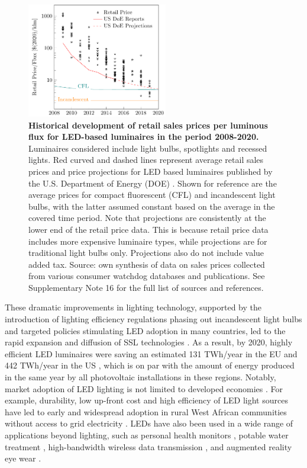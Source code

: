 \documentclass[parskip=full]{article}
\begin{document}
\begin{figure}[h!]
\centering
  \includegraphics[height=5cm]{figures/cost_lamp_small.pdf}
  \caption{\textbf{Historical development of retail sales prices per luminous flux for LED-based luminaires in the period 2008-2020.} Luminaires considered include light bulbs, spotlights and recessed lights. Red curved and dashed lines represent average retail sales prices and price projections for LED based luminaires published by the U.S. Department of Energy (DOE) \cite{national2013assessment}. Shown for reference are the average prices for compact fluorescent (CFL) and incandescent light bulbs, with the latter assumed constant based on the average in the covered time period. Note that projections are consistently at the lower end of the retail price data. This is because retail price data includes more expensive luminaire types, while projections are for traditional light bulbs only. Projections also do not include value added tax. Source: own synthesis of data on sales prices collected from various consumer watchdog databases and publications. See Supplementary Note 16 for the full list of sources and references.}
  \label{fgr:cost_lamp_small}
\end{figure}

These dramatic improvements in lighting technology, supported by the introduction of lighting efficiency regulations phasing out incandescent light bulbs and targeted policies stimulating LED adoption in many countries, led to the rapid expansion and diffusion of SSL technologies \cite{weinold2020long, stegmaier2021incandescent, Mills2014}. As a result, by 2020, highly efficient LED luminaires were saving an estimated 131 TWh/year in the EU \cite{eu2019impactass} and 442 TWh/year in the US \cite{guidehouse2020adoption}, which is on par with the amount of energy produced in the same year by all photovoltaic installations in these regions. Notably, market adoption of LED lighting is not limited to developed economies \cite{Kamat2020}. For example, durability, low up-front cost and high efficiency of LED light sources have led to early and widespread adoption in rural West African communities without access to grid electricity \cite{Bensch2017}. LEDs have also been used in a wide range of applications beyond lighting, such as personal health monitors \cite{Wyatt2020}, potable water treatment \cite{Lui2014}, high-bandwidth wireless data transmission \cite{Haas2016}, and augmented reality eye wear \cite{Lee2016}. 
\end{document}
